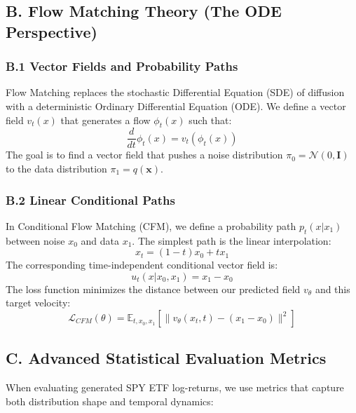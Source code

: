 \documentclass[a4paper,12pt]{article}
\begin{document}
\subsection{B. Flow Matching Theory (The ODE Perspective)}

\subsubsection{B.1 Vector Fields and Probability Paths}
Flow Matching replaces the stochastic Differential Equation (SDE) of diffusion with a deterministic Ordinary Differential Equation (ODE). We define a vector field $v_t(x)$ that generates a flow $\phi_t(x)$ such that:
\begin{equation}
    \frac{d}{dt} \phi_t(x) = v_t(\phi_t(x))
\end{equation}
The goal is to find a vector field that pushes a noise distribution $\pi_0 = \mathcal{N}(0, \mathbf{I})$ to the data distribution $\pi_1 = q(\mathbf{x})$.

\subsubsection{B.2 Linear Conditional Paths}
In Conditional Flow Matching (CFM), we define a probability path $p_t(x|x_1)$ between noise $x_0$ and data $x_1$. The simplest path is the linear interpolation:
\begin{equation}
    x_t = (1-t)x_0 + t x_1
\end{equation}
The corresponding time-independent conditional vector field is:
\begin{equation}
    u_t(x|x_0, x_1) = x_1 - x_0
\end{equation}
The loss function minimizes the distance between our predicted field $v_\theta$ and this target velocity:
\begin{equation}
    \mathcal{L}_{CFM}(\theta) = \mathbb{E}_{t, x_0, x_1} [\|v_\theta(x_t, t) - (x_1 - x_0)\|^2]
\end{equation}

\subsection{C. Advanced Statistical Evaluation Metrics}

When evaluating generated SPY ETF log-returns, we use metrics that capture both distribution shape and temporal dynamics:
\end{document}
